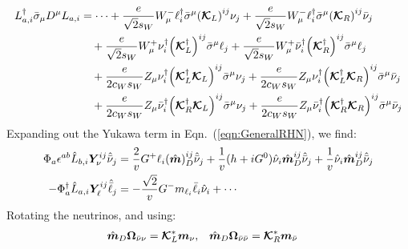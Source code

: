 \begin{align}
	L^{\dagger}_{a,i}\bar{\sigma}_{\mu}D^{\mu}L_{a,i}
	 & = \cdots
	+\frac{e}{\sqrt{2}s_{W}}W^{-}_{\mu}\ell_{i}^{\dagger}\bar{\sigma}^{\mu}\qty(\bm{\mathcal{K}}_{L})^{ij}\nu_{j}
	+\frac{e}{\sqrt{2}s_{W}}W^{-}_{\mu}\ell_{i}^{\dagger}\bar{\sigma}^{\mu}\qty(\bm{\mathcal{K}}_{R})^{ij}\bar{\nu}_{j}\notag                \\
	 & \quad
	+\frac{e}{\sqrt{2}s_{W}}W^{+}_{\mu}\nu_{i}^{\dagger}\qty(\bm{\mathcal{K}}_{L}^{\dagger})^{ij}\bar{\sigma}^{\mu}\ell_{j}
	+\frac{e}{\sqrt{2}s_{W}}W^{+}_{\mu}\bar{\nu}_{i}^{\dagger}\qty(\bm{\mathcal{K}}_{R}^{\dagger})^{ij}\bar{\sigma}^{\mu}\ell_{j}\notag      \\
	 & \quad
	+\frac{e}{2c_{W}s_{W}}Z_{\mu}\nu_{i}^{\dagger}\qty(\bm{\mathcal{K}}_{L}^{\dagger}\bm{\mathcal{K}}_{L})^{ij}\bar{\sigma}^{\mu}\nu_{j}
	+\frac{e}{2c_{W}s_{W}}Z_{\mu}\nu_{i}^{\dagger}\qty(\bm{\mathcal{K}}_{L}^{\dagger}\bm{\mathcal{K}}_{R})^{ij}\bar{\sigma}^{\mu}\bar{\nu}_{j}\notag \\
	 & \quad
	+\frac{e}{2c_{W}s_{W}}Z_{\mu}\bar{\nu}_{i}^{\dagger}\qty(\bm{\mathcal{K}}_{R}^{\dagger}\bm{\mathcal{K}}_{L})^{ij}\bar{\sigma}^{\mu}\nu_{j}
	+\frac{e}{2c_{W}s_{W}}Z_{\mu}\bar{\nu}_{i}^{\dagger}\qty(\bm{\mathcal{K}}_{R}^{\dagger}\bm{\mathcal{K}}_{R})^{ij}\bar{\sigma}^{\mu}\bar{\nu}_{j}\notag
\end{align}
Expanding out the Yukawa term in Eqn.~(\ref{eqn:GeneralRHN}), we find:
\begin{align}
	\Phi_{a}\epsilon^{ab}\hat{L}_{b,i}\bm{Y}^{ij}_{\nu}\hat{\bar{\nu}}_{j}
	 & =
	\frac{2}{v}G^{+}\ell_{i}\qty(\hat{\bm{m}})^{ij}_{D}\hat{\bar{\nu}}_j +
	\frac{1}{v}(h + iG^{0})\hat{\nu}_i\hat{\bm{m}}^{ij}_{D}\hat{\bar{\nu}}_{j}
	+ \frac{1}{v}\hat{\nu}_i\hat{\bm{m}}^{ij}_{D}\hat{\bar{\nu}}_{j} \\
	-\Phi_{a}^{\dagger}\hat{L}_{a,i}\bm{Y}^{ij}_{\ell}\hat{\bar{\ell}}_{j}
	 & =
	-\frac{\sqrt{2}}{v}G^{-}m_{\ell_{i}}\bar{\ell}_{i}\hat{\nu}_{i} +\cdots
\end{align}
Rotating the neutrinos, and using:
\begin{align}
	\hat{\bm{m}}_{D}\OmegaNVb & = \bm{\cK}_{L}^{*}\bm{m}_{\nu}, & %
	\hat{\bm{m}}_{D}\OmegaNNb & = \bm{\cK}_{R}^{*}\bm{m}_{\rhn}   %
\end{align}
